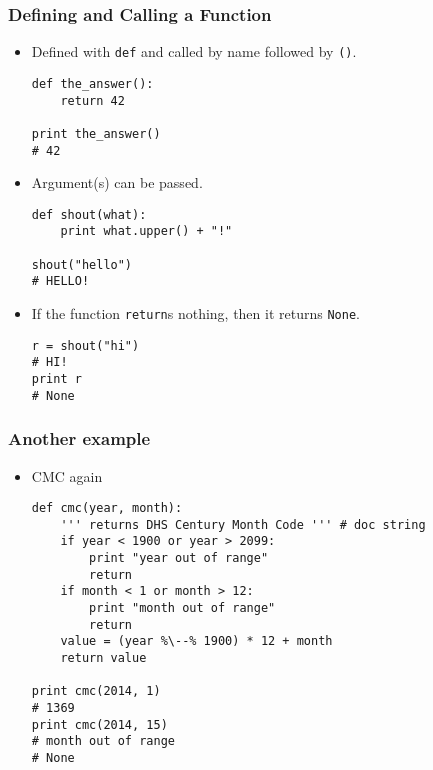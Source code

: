 \documentclass{beamer}
\begin{document}
\begin{frame}[fragile]
\frametitle{Defining and Calling a Function}
\begin{itemize}
\item Defined with \lstinline{def} and
      called by name followed by \lstinline{()}.
\begin{lstlisting}
def the_answer():
    return 42

print the_answer()
# 42
\end{lstlisting}
\item Argument(s) can be passed. 
\begin{lstlisting}
def shout(what):
    print what.upper() + "!"

shout("hello")
# HELLO!
\end{lstlisting}
\item If the function \lstinline{return}s nothing,
      then it returns \lstinline{None}.
\begin{lstlisting}
r = shout("hi")
# HI!
print r
# None
\end{lstlisting}
\end{itemize}
\end{frame}

\begin{frame}[fragile]
\frametitle{Another example}
\begin{itemize}
\item CMC again
\begin{lstlisting}[escapechar=\%]
def cmc(year, month):
    ''' returns DHS Century Month Code ''' # doc string
    if year < 1900 or year > 2099:
        print "year out of range"
        return
    if month < 1 or month > 12:
        print "month out of range"
        return
    value = (year %\--% 1900) * 12 + month
    return value

print cmc(2014, 1)
# 1369
print cmc(2014, 15)
# month out of range
# None               
\end{lstlisting}
\end{itemize}
\end{frame}
\end{document}
